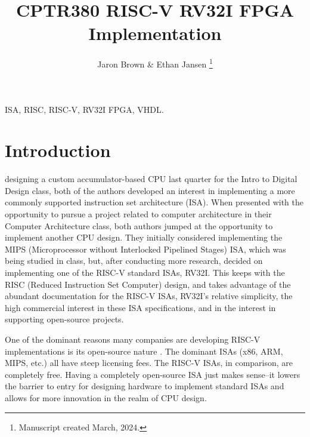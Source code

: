 \documentclass[lettersize,journal]{IEEEtran}
\begin{document}
\title{CPTR380 RISC-V RV32I FPGA Implementation}
\author{Jaron Brown \& Ethan Jansen
\thanks{Manuscript created March, 2024.}}

\maketitle

\begin{abstract}
\color{red}{TBD}
\end{abstract}

\begin{IEEEkeywords}
ISA, RISC, RISC-V, RV32I FPGA, VHDL.
\end{IEEEkeywords}


\section{Introduction}
 designing a custom accumulator-based CPU last quarter for the Intro to Digital Design class, 
both of the authors developed an interest in implementing a more commonly supported instruction set architecture (ISA). 
When presented with the opportunity to pursue a project related to computer architecture in their Computer Architecture class, 
both authors jumped at the opportunity to implement another CPU design.
They initially considered implementing the MIPS (Microprocessor without Interlocked Pipelined Stages) ISA, which was being studied in class, but, 
after conducting more research, decided on implementing one of the RISC-V standard ISAs, RV32I.
This keeps with the RISC (Reduced Instruction Set Computer) design, and takes advantage of the abundant documentation for the RISC-V ISAs, RV32I's relative simplicity, the high commercial interest in these ISA specifications,
and in the interest in supporting open-source projects.

One of the dominant reasons many companies are developing RISC-V implementations is its open-source nature \cite{riscvhistory}. 
The dominant ISAs (x86, ARM, MIPS, etc.) all have steep licensing fees.
The RISC-V ISAs, in comparison, are completely free. 
Having a completely open-source ISA just makes sense--it lowers the barrier to entry for designing hardware to implement standard 
ISAs and allows for more innovation in the realm of CPU design.  
\end{document}
